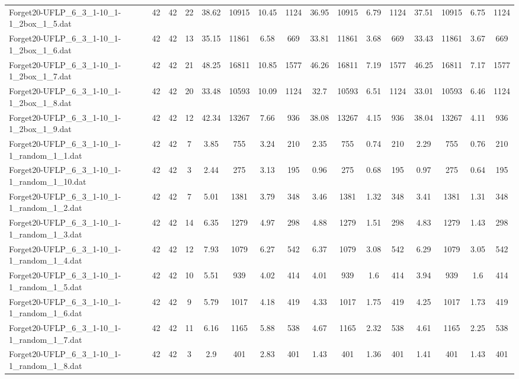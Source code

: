 \begin{sidewaystable}[!ht]
{\begin{tabular}{lccccccccccccccc}
Forget20-UFLP\_6\_3\_1-10\_1-1\_2box\_1\_5.dat & 42 & 42 & 22 & 38.62 & 10915 & 10.45 & 1124 & 36.95 & 10915 & 6.79 & 1124 & 37.51 & 10915 & 6.75 & 1124 \\
Forget20-UFLP\_6\_3\_1-10\_1-1\_2box\_1\_6.dat & 42 & 42 & 13 & 35.15 & 11861 & 6.58 & 669 & 33.81 & 11861 & 3.68 & 669 & 33.43 & 11861 & 3.67 & 669 \\
Forget20-UFLP\_6\_3\_1-10\_1-1\_2box\_1\_7.dat & 42 & 42 & 21 & 48.25 & 16811 & 10.85 & 1577 & 46.26 & 16811 & 7.19 & 1577 & 46.25 & 16811 & 7.17 & 1577 \\
Forget20-UFLP\_6\_3\_1-10\_1-1\_2box\_1\_8.dat & 42 & 42 & 20 & 33.48 & 10593 & 10.09 & 1124 & 32.7 & 10593 & 6.51 & 1124 & 33.01 & 10593 & 6.46 & 1124 \\
Forget20-UFLP\_6\_3\_1-10\_1-1\_2box\_1\_9.dat & 42 & 42 & 12 & 42.34 & 13267 & 7.66 & 936 & 38.08 & 13267 & 4.15 & 936 & 38.04 & 13267 & 4.11 & 936 \\
Forget20-UFLP\_6\_3\_1-10\_1-1\_random\_1\_1.dat & 42 & 42 & 7 & 3.85 & 755 & 3.24 & 210 & 2.35 & 755 & 0.74 & 210 & 2.29 & 755 & 0.76 & 210 \\
Forget20-UFLP\_6\_3\_1-10\_1-1\_random\_1\_10.dat & 42 & 42 & 3 & 2.44 & 275 & 3.13 & 195 & 0.96 & 275 & 0.68 & 195 & 0.97 & 275 &  \textcolor{blue2}{0.64} & 195 \\
Forget20-UFLP\_6\_3\_1-10\_1-1\_random\_1\_2.dat & 42 & 42 & 7 & 5.01 & 1381 & 3.79 & 348 & 3.46 & 1381 & 1.32 & 348 & 3.41 & 1381 & 1.31 & 348 \\
Forget20-UFLP\_6\_3\_1-10\_1-1\_random\_1\_3.dat & 42 & 42 & 14 & 6.35 & 1279 & 4.97 & 298 & 4.88 & 1279 & 1.51 & 298 & 4.83 & 1279 & 1.43 & 298 \\
Forget20-UFLP\_6\_3\_1-10\_1-1\_random\_1\_4.dat & 42 & 42 & 12 & 7.93 & 1079 & 6.27 & 542 & 6.37 & 1079 & 3.08 & 542 & 6.29 & 1079 & 3.05 & 542 \\
Forget20-UFLP\_6\_3\_1-10\_1-1\_random\_1\_5.dat & 42 & 42 & 10 & 5.51 & 939 & 4.02 & 414 & 4.01 & 939 & 1.6 & 414 & 3.94 & 939 & 1.6 & 414 \\
Forget20-UFLP\_6\_3\_1-10\_1-1\_random\_1\_6.dat & 42 & 42 & 9 & 5.79 & 1017 & 4.18 & 419 & 4.33 & 1017 & 1.75 & 419 & 4.25 & 1017 & 1.73 & 419 \\
Forget20-UFLP\_6\_3\_1-10\_1-1\_random\_1\_7.dat & 42 & 42 & 11 & 6.16 & 1165 & 5.88 & 538 & 4.67 & 1165 & 2.32 & 538 & 4.61 & 1165 &  \textcolor{blue2}{2.25} & 538 \\
Forget20-UFLP\_6\_3\_1-10\_1-1\_random\_1\_8.dat & 42 & 42 & 3 & 2.9 & 401 & 2.83 & 401 & 1.43 & 401 & 1.36 & 401 & 1.41 & 401 & 1.43 & 401 \\

\end{tabular}}
\end{sidewaystable}
